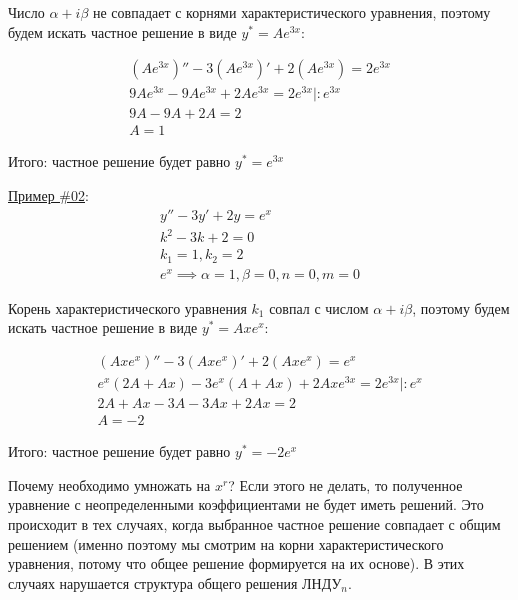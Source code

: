 Число  \(\alpha + i \beta\) не совпадает с корнями характеристического
уравнения, поэтому будем искать частное решение в виде \(y^{*} = A e^{3x}\):

\begin{align*}
  (A e^{3x})'' - 3 (A e^{3x})' + 2 (A e^{3x}) = 2 e^{3x} \\
  9A e^{3x} - 9A e^{3x} + 2A e^{3x} = 2 e^{3x} \mid \colon e^{3x} \\
  9A - 9A + 2A = 2 \\
  A = 1
\end{align*}

Итого: частное решение будет равно \(y^{*} = e^{3x}\)

\underline{Пример \#02}:
\begin{align*}
  y'' - 3 y' + 2y = e^{x} \\
  k^{2} - 3k + 2 = 0 \\
  k_{1} = 1, k_{2} = 2 \\
  e^{x} \implies \alpha = 1, \beta = 0, n = 0, m = 0
\end{align*}

Корень характеристического уравнения \(k_{1}\) совпал с числом
\(\alpha + i \beta\), поэтому будем искать частное решение в виде
\(y^{*} = Ax e^{x}\):

\begin{align*}
  (Ax e^{x})'' - 3 (Ax e^{x})' + 2 (Ax e^{x}) = e^{x} \\
  e^{x} (2A + Ax) - 3 e^{x} (A + Ax) + 2Ax e^{3x} = 2 e^{3x}
    \mid \colon e^{x} \\
  2A + Ax - 3A - 3Ax + 2Ax = 2 \\
  A = -2
\end{align*}

Итого: частное решение будет равно \(y^{*} = -2 e^{x}\)

\begin{remark}
  Почему необходимо умножать на \(x^{r}\)? Если этого не делать, то полученное
  уравнение с неопределенными коэффициентами не будет иметь решений. Это
  происходит в тех случаях, когда выбранное частное решение совпадает с общим
  решением (именно поэтому мы смотрим на корни характеристического уравнения,
  потому что общее решение формируется на их основе). В этих случаях нарушается
  структура общего решения ЛНДУ\(_n\).
\end{remark}
